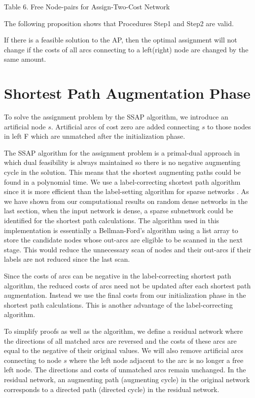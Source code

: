 \vskip 2pt
{Table 6. Free Node-pairs for Assign-Two-Cost Network}
\vskip 5pt

The following proposition shows that Procedures Step1 and Step2 are valid.

 If there is a feasible solution to the
AP, then
the optimal assignment will not change if the costs of all arcs connecting
to a left(right) node are changed by the same amount.
\bull

\section{ Shortest Path Augmentation Phase}

To solve the assignment problem by the SSAP algorithm, we introduce an
artificial node $s$. Artificial arcs of cost zero are added connecting
$s$ to those nodes in left F which are unmatched after the
initialization phase. 

The SSAP algorithm for the assignment problem is a primal-dual
approach in which dual feasibility is always maintained so there is no
negative augmenting cycle in the solution.  This means that the 
shortest augmenting paths could be found in a polynomial time. We use
a label-correcting shortest path algorithm since it is more efficient
than the label-setting algorithm for sparse networks \cite{orl1}. As
we have shown from our computational results on random dense networks
in the last section, when the input network is dense, 
a sparse subnetwork could be identified for the shortest path calculations.
The algorithm used in this implementation
is essentially a Bellman-Ford's algorithm 
\cite{bel1} \cite{for1}
using a list array to store the candidate nodes whose out-arcs
are eligible to be scanned in the next stage. This would
reduce the unnecessary scan of nodes and their out-arcs if 
their labels are not reduced since the last scan.

Since the costs of arcs can
be negative in the label-correcting shortest path algorithm, the
reduced costs of arcs need not be updated after each shortest path
augmentation. Instead we use the final costs from our initialization
phase in the shortest path calculations.  This is another advantage of
the label-correcting algorithm.

To simplify proofs as well as the algorithm, we define a residual
network where the directions of all matched arcs are reversed and the
costs of these arcs are equal to the negative of their original
values.  We will also remove artificial arcs connecting to node $s$
where the left node adjacent to the arc is no longer a free left node.
The directions and costs of unmatched arcs remain unchanged.
In the residual network, an augmenting path (augmenting cycle) in the
original network corresponds to a directed path (directed cycle) in
the residual network.

